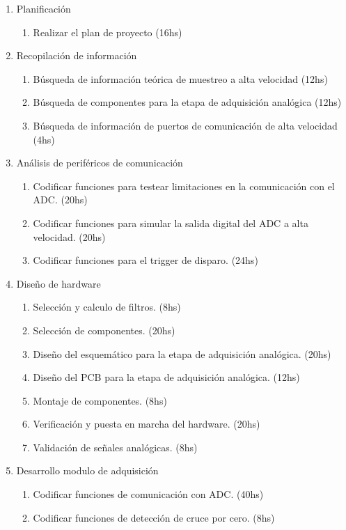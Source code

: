 \documentclass[11pt]{charter}
\begin{document}
\begin{enumerate}
\item Planificación
	\begin{enumerate}
	\item Realizar el plan de proyecto (16hs)
	\end{enumerate}
\item Recopilación de información
	\begin{enumerate}
	\item Búsqueda de información teórica de muestreo a alta velocidad (12hs)
	\item Búsqueda de componentes para la etapa de adquisición analógica (12hs)
	\item Búsqueda de información de puertos de comunicación de alta velocidad (4hs)
	\end{enumerate}
\item Análisis de periféricos de comunicación
	\begin{enumerate}
	\item Codificar funciones para testear limitaciones en la comunicación con el ADC. (20hs)
	\item Codificar funciones para simular la salida digital del ADC a alta velocidad. (20hs)
	\item Codificar funciones para el trigger de disparo. (24hs)
	\end{enumerate}
\item Diseño de hardware
	\begin{enumerate}
	\item Selección y calculo de filtros. (8hs)
	\item Selección de componentes. (20hs)
	\item Diseño del esquemático para la etapa de adquisición analógica. (20hs)
	\item Diseño del PCB para la etapa de adquisición analógica. (12hs)
	\item Montaje de componentes. (8hs)
	\item Verificación y puesta en marcha del hardware. (20hs)
	\item Validación de señales analógicas. (8hs)
	\end{enumerate}
\item Desarrollo modulo de adquisición
	\begin{enumerate}
	\item Codificar funciones de comunicación con ADC. (40hs)
	\item Codificar funciones de detección de cruce por cero. (8hs)

\end{enumerate}
\end{enumerate}
\end{document}
